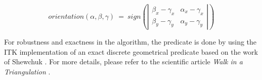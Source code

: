 \documentclass{InsightArticle}
\begin{document}
\begin{equation} \label{predicate}
\mathit{orientation(\alpha, \beta, \gamma)} ~=~\mathit{sign} \left( \left\lvert
\begin{matrix}
\beta_{x}-\gamma_{x} & \alpha_{x}-\gamma_{x} \\
\beta_{y}-\gamma_{y} & \alpha_{y}-\gamma_{y}
\end{matrix}
\right\rvert \right)
\end{equation}

For robustness and exactness in the algorithm, the predicate is done by using the ITK implementation of an exact discrete geometrical predicate \cite{Moreau2011} based on the work of Shewchuk \cite{Shewchuk97a}.
For more details, please refer to the scientific article \textit{Walk in a Triangulation} \cite{Devillers2001}.

\begin{figure}
\center
{} \hspace{10pt}
\label{fig:straightwalk}
\end{figure}
\end{document}
